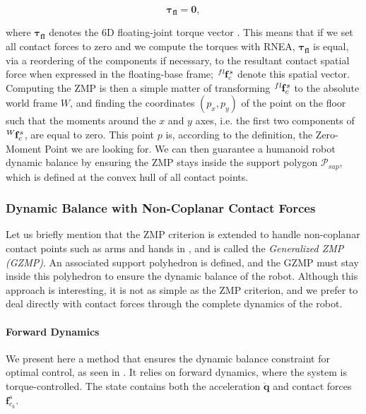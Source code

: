 \begin{equation}
\label{eq:chap3-dynamic-balance-inverse}
 \boldsymbol{\tau_{fl}}=\mathbf{0},
\end{equation}

where $\boldsymbol{\tau_{fl}}$ denotes the 6D floating-joint torque
vector \cite{hirukawa2006universal}. This means that if we set all
contact forces to zero and we compute the torques with RNEA,
$\boldsymbol{\tau_{fl}}$ is equal, via a reordering of the components
if necessary, to the resultant contact spatial force when expressed in
the floating-base frame; $\tensor*[^{fl}]{\mathbf{f}}{_c^s}$ denote
this spatial vector. Computing the ZMP is then a simple matter of
transforming $\tensor*[^{fl}]{\mathbf{f}}{_c^s}$ to the absolute world
frame $W$, and finding the coordinates $(p_x,p_y)$ of the point on the
floor such that the moments around the $x$ and $y$ axes, i.e. the
first two components of $\tensor*[^W]{\mathbf{f}}{_c^s}$, are equal to
zero. This point $p$ is, according to the definition, the Zero-Moment
Point we are looking for. We can then guarantee a humanoid robot
dynamic balance by ensuring the ZMP stays inside the support polygon
$\mathcal{P}_{sup}$, which is defined at the convex hull of all
contact points.

\subsubsection{Dynamic Balance with Non-Coplanar Contact Forces}

Let us briefly mention that the ZMP criterion is extended to handle
non-coplanar contact points such as arms and hands in
\cite{harada2003zmp}, and is called the \emph{Generalized ZMP
  (GZMP)}. An associated support polyhedron is defined, and the GZMP
must stay inside this polyhedron to ensure the dynamic balance of the
robot. Although this approach is interesting, it is not as simple as
the ZMP criterion, and we prefer to deal directly with contact forces
through the complete dynamics of the robot.

\paragraph{Forward Dynamics}

We present here a method that ensures the dynamic balance constraint
for optimal control, as seen in \cite{mombaur2005open}. It relies on
forward dynamics, where the system is torque-controlled. The state
contains both the acceleration $\ddot{\mathbf{q}}$ and contact forces
$\mathbf{f}^s_{c_k}$. 

